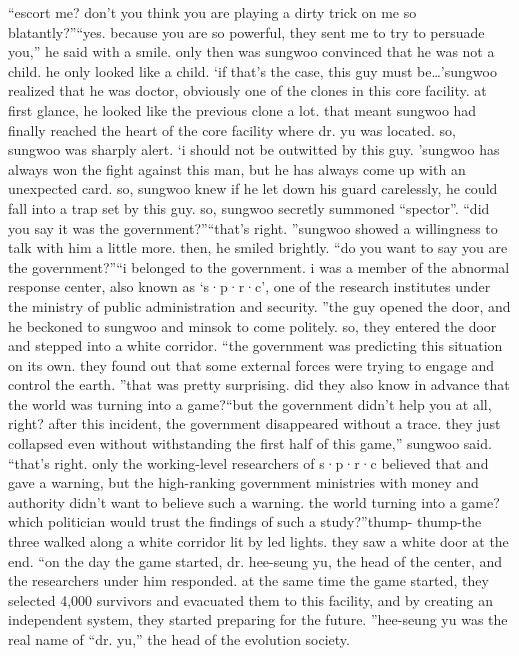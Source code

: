 “escort me? don’t you think you are playing a dirty trick on me so blatantly?”“yes.
 because you are so powerful, they sent me to try to persuade you,” he said with a smile.
only then was sungwoo convinced that he was not a child.
he only looked like a child.
‘if that’s the case, this guy must be…’sungwoo realized that he was doctor, obviously one of the clones in this core facility.
at first glance, he looked like the previous clone a lot.
that meant sungwoo had finally reached the heart of the core facility where dr.
 yu was located.
so, sungwoo was sharply alert.
‘i should not be outwitted by this guy.
’sungwoo has always won the fight against this man, but he has always come up with an unexpected card.
 so, sungwoo knew if he let down his guard carelessly, he could fall into a trap set by this guy.
so, sungwoo secretly summoned “spector”.
“did you say it was the government?”“that’s right.
”sungwoo showed a willingness to talk with him a little more.
 then, he smiled brightly.
“do you want to say you are the government?”“i belonged to the government.
 i was a member of the abnormal response center, also known as ‘s·p·r·c’, one of the research institutes under the ministry of public administration and security.
”the guy opened the door, and he beckoned to sungwoo and minsok to come politely.
so, they entered the door and stepped into a white corridor.
“the government was predicting this situation on its own.
 they found out that some external forces were trying to engage and control the earth.
”that was pretty surprising.
 did they also know in advance that the world was turning into a game?“but the government didn’t help you at all, right? after this incident, the government disappeared without a trace.
 they just collapsed even without withstanding the first half of this game,” sungwoo said.
“that’s right.
 only the working-level researchers of s·p·r·c believed that and gave a warning, but the high-ranking government ministries with money and authority didn’t want to believe such a warning.
 the world turning into a game? which politician would trust the findings of such a study?”thump- thump-the three walked along a white corridor lit by led lights.
 they saw a white door at the end.
“on the day the game started, dr.
 hee-seung yu, the head of the center, and the researchers under him responded.
 at the same time the game started, they selected 4,000 survivors and evacuated them to this facility, and by creating an independent system, they started preparing for the future.
”hee-seung yu was the real name of “dr.
 yu,” the head of the evolution society.

